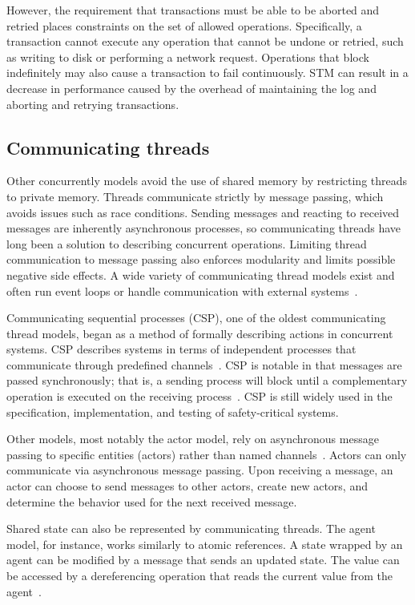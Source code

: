\documentclass{sig-alternate}
\begin{document}
However, the requirement that transactions must be able to be aborted and retried places constraints on the set of allowed operations. Specifically, a transaction cannot execute any operation that cannot be undone or retried, such as writing to disk or performing a network request. Operations that block indefinitely may also cause a transaction to fail continuously. STM can result in a decrease in performance caused by the overhead of maintaining the log and aborting and retrying transactions.

\subsection{Communicating threads}

Other concurrently models avoid the use of shared memory by restricting threads to private memory. Threads communicate strictly by message passing, which avoids issues such as race conditions. Sending messages and reacting to received messages are inherently asynchronous processes, so communicating threads have long been a solution to describing concurrent operations. Limiting thread communication to message passing also enforces modularity and limits possible negative side effects. A wide variety of communicating thread models exist and often run event loops or handle communication with external systems~\cite{Swalens2014}.

Communicating sequential processes (CSP), one of the oldest communicating thread models, began as a method of formally describing actions in concurrent systems. CSP describes systems in terms of independent processes that communicate through predefined channels~\cite{Hoare1978}. CSP is notable in that messages are passed synchronously; that is, a sending process will block until a complementary operation is executed on the receiving process~\cite{Swalens2014}. CSP is still widely used in the specification, implementation, and testing of safety-critical systems.

Other models, most notably the actor model, rely on asynchronous message passing to specific entities (actors) rather than named channels~\cite{Agha1986}. Actors can only communicate via asynchronous message passing. Upon receiving a message, an actor can choose to send messages to other actors, create new actors, and determine the behavior used for the next received message.

Shared state can also be represented by communicating threads. The agent model, for instance, works similarly to atomic references. A state wrapped by an agent can be modified by a message that sends an updated state. The value can be accessed by a dereferencing operation that reads the current value from the agent~\cite{Swalens2014}.
\end{document}
